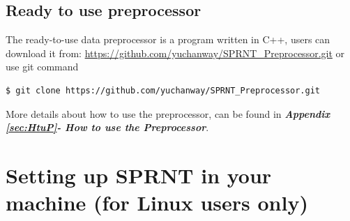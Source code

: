 \documentclass[12pt, letterpaper]{article}
\begin{document}
\subsection{Ready to use preprocessor}
\indent The ready-to-use data preprocessor is a program written in C++, users can download it from: \newline
\url{https://github.com/yuchanway/SPRNT_Preprocessor.git}\newline
\newline
or use git command
\begin{lstlisting}[frame=single]
$ git clone https://github.com/yuchanway/SPRNT_Preprocessor.git
\end{lstlisting}
More details about how to use the preprocessor, can be found in \textbf{\emph{Appendix \ref{sec:HtuP}- How to use the Preprocessor}}.
\newpage



\section{Setting up SPRNT in your machine (for Linux users only)}
\end{document}
